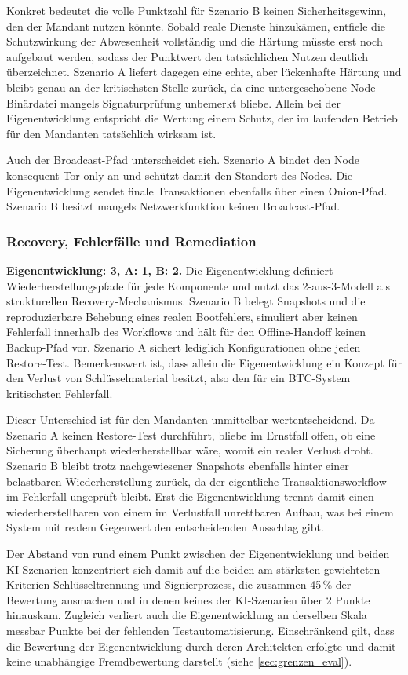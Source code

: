 {Konkret bedeutet die volle Punktzahl für Szenario B keinen Sicherheitsgewinn, den der Mandant nutzen könnte. Sobald reale Dienste hinzukämen, entfiele die Schutzwirkung der Abwesenheit vollständig und die Härtung müsste erst noch aufgebaut werden, sodass der Punktwert den tatsächlichen Nutzen deutlich überzeichnet. Szenario A liefert dagegen eine echte, aber lückenhafte Härtung und bleibt genau an der kritischsten Stelle zurück, da eine untergeschobene Node-Binärdatei mangels Signaturprüfung unbemerkt bliebe. Allein bei der Eigenentwicklung entspricht die Wertung einem Schutz, der im laufenden Betrieb für den Mandanten tatsächlich wirksam ist.

Auch der Broadcast-Pfad unterscheidet sich. 
Szenario A bindet den Node konsequent Tor-only an und schützt damit den Standort des Nodes. Die Eigenentwicklung sendet finale Transaktionen ebenfalls über einen Onion-Pfad.
Szenario B besitzt mangels Netzwerkfunktion keinen Broadcast-Pfad.

\subsubsection{Recovery, Fehlerfälle und Remediation}
\textbf{Eigenentwicklung: 3, A: 1, B: 2.} Die Eigenentwicklung definiert Wiederherstellungspfade für jede Komponente und nutzt das 2-aus-3-Modell als strukturellen Recovery-Mechanismus.
Szenario B belegt Snapshots und die reproduzierbare Behebung eines realen Bootfehlers, simuliert aber keinen Fehlerfall innerhalb des Workflows und hält für den Offline-Handoff keinen Backup-Pfad vor.
Szenario A sichert lediglich Konfigurationen ohne jeden Restore-Test.
Bemerkenswert ist, dass allein die Eigenentwicklung ein Konzept für den Verlust von Schlüsselmaterial besitzt, also den für ein \ac{BTC}-System kritischsten Fehlerfall.

Dieser Unterschied ist für den Mandanten unmittelbar wertentscheidend. Da Szenario A keinen Restore-Test durchführt, bliebe im Ernstfall offen, ob eine Sicherung überhaupt wiederherstellbar wäre, womit ein realer Verlust droht. Szenario B bleibt trotz nachgewiesener Snapshots ebenfalls hinter einer belastbaren Wiederherstellung zurück, da der eigentliche Transaktionsworkflow im Fehlerfall ungeprüft bleibt. Erst die Eigenentwicklung trennt damit einen wiederherstellbaren von einem im Verlustfall unrettbaren Aufbau, was bei einem System mit realem Gegenwert den entscheidenden Ausschlag gibt.

Der Abstand von rund einem Punkt zwischen der Eigenentwicklung und beiden \ac{KI}-Szenarien konzentriert sich damit auf die beiden am stärksten gewichteten Kriterien Schlüsseltrennung und Signierprozess, die zusammen 45\,\% der Bewertung ausmachen und in denen keines der \ac{KI}-Szenarien über 2 Punkte hinauskam. Zugleich verliert auch die Eigenentwicklung an derselben Skala messbar Punkte bei der fehlenden Testautomatisierung. Einschränkend gilt, dass die Bewertung der Eigenentwicklung durch deren Architekten erfolgte und damit keine unabhängige Fremdbewertung darstellt (siehe \ref{sec:grenzen_eval}).\cite{NixOsHot_github,Krypto_Basis_github,NixOsCold_github}

}

